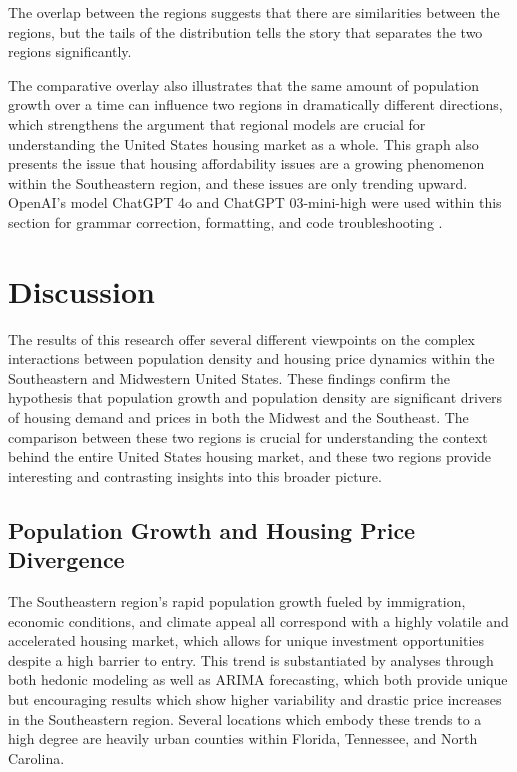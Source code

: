 \documentclass[journal,article,submit,pdftex,moreauthors]{Definitions/mdpi}
\begin{document}
 The overlap between the regions suggests that there are similarities between the regions, but the tails of the distribution tells the story that separates the two regions significantly. 

The comparative overlay also illustrates that the same amount of population growth over a time can influence two regions in dramatically different directions, which strengthens the argument that regional models are crucial for understanding the United States housing market as a whole. This graph also presents the issue that housing affordability issues are a growing phenomenon within the Southeastern region, and these issues are only trending upward. OpenAI’s model ChatGPT 4o and ChatGPT 03-mini-high were used within this section for grammar correction, formatting, and code troubleshooting \citep{openai_2025_chatgpt}.


\section{Discussion}

The results of this research offer several different viewpoints on the complex interactions between population density and housing price dynamics within the Southeastern and Midwestern United States. These findings confirm the hypothesis that population growth and population density are significant drivers of housing demand and prices in both the Midwest and the Southeast. The comparison between these two regions is crucial for understanding the context behind the entire United States housing market, and these two regions provide interesting and contrasting insights into this broader picture.

\subsection{Population Growth and Housing Price Divergence}

The Southeastern region’s rapid population growth fueled by immigration, economic conditions, and climate appeal all correspond with a highly volatile and accelerated housing market, which allows for unique investment opportunities despite a high barrier to entry.  This trend is substantiated by analyses through both hedonic modeling as well as ARIMA forecasting, which both provide unique but encouraging results which show higher variability and drastic price increases in the Southeastern region. Several locations which embody these trends to a high degree are heavily urban counties within Florida, Tennessee, and North Carolina.
\end{document}
